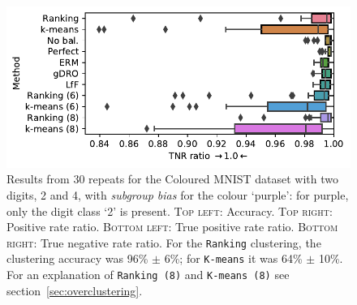 \begin{figure}[htp]
  \includegraphics[width=0.8\columnwidth]{paper3/figures/cmnist_2v4_partial_overcluster_tnrr.pdf}
  \caption{
    Results from 30 repeats for the Coloured MNIST dataset with two digits, 2 and 4, with \emph{subgroup bias} for the colour `{\color{purple}purple}': for {\color{purple}purple}, only the digit class `2' is present.
    \textsc{Top left}: Accuracy.
    \textsc{Top right}: Positive rate ratio.
    \textsc{Bottom left}: True positive rate ratio.
    \textsc{Bottom right}: True negative rate ratio.
    For the \texttt{Ranking} clustering, the clustering accuracy was 96\% $\pm$ 6\%;
    for \texttt{K-means} it was 64\% $\pm$ 10\%.
    For an explanation of \texttt{Ranking (8)} and \texttt{K-means (8)} see section~\ref{sec:overclustering}.
  }%
  \label{fig:cmnist-2v4-partial-add}
\end{figure}

